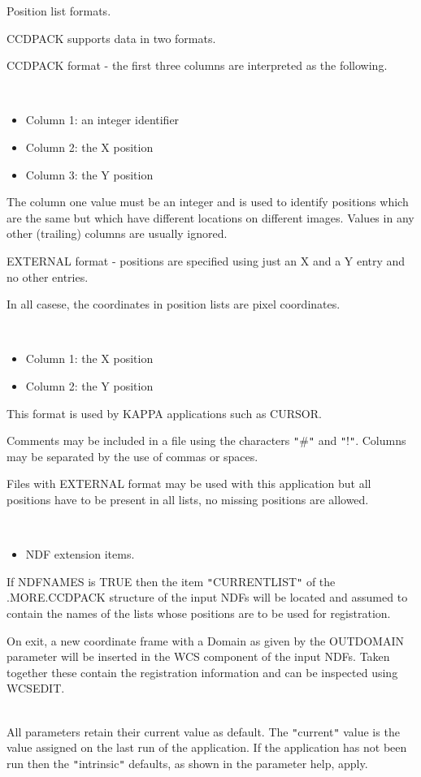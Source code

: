 \documentclass[twoside,11pt]{article}
\newcommand{\xref}[3]{#1}
\renewcommand{\_}{\texttt{\symbol{95}}}
\newcommand{\qt}[1]{{\tt "}#1{\tt "}}
\newcommand{\sstdiytopic}[2]{\item[#1:] \mbox{} \\[1.3ex] #2}
\newcommand{\sstitemlist}[1]{
  \mbox{} \\
  \vspace{-3.5ex}
  \begin{itemize}
     #1
  \end{itemize}
}
\newcommand{\sstitem}{\item}
\newcommand{\sstdiytopic}[2]{\item[{#1}] #2 }
\newcommand{\sstitemlist}[1]{
      \begin{itemize}
         #1
      \end{itemize}
      \\
   }
\newcommand{\sstitem}{\item}
\begin{document}
{{{         \sstitem
         Position list formats.

      }
        CCDPACK supports data in two formats.

        CCDPACK format - the first three columns are interpreted as the
        following.

      \sstitemlist{

         \sstitem
              Column 1: an integer identifier

         \sstitem
              Column 2: the X position

         \sstitem
              Column 3: the Y position

      }
        The column one value must be an integer and is used to identify
        positions which are the same but which have different locations
        on different images. Values in any other (trailing) columns are
        usually ignored.

        EXTERNAL format - positions are specified using just an X and
        a Y entry and no other entries.

        In all casese, the coordinates in position lists are pixel
        coordinates.

      \sstitemlist{

         \sstitem
              Column 1: the X position

         \sstitem
              Column 2: the Y position

      }
        This format is used by KAPPA applications such as
        \xref{CURSOR}{sun95}{CURSOR}.

        Comments may be included in a file using the characters \qt{\#} and
        \qt{!}. Columns may be separated by the use of commas or spaces.

        Files with EXTERNAL format may be used with this application but
        all positions have to be present in all lists, no missing
        positions are allowed.

      \sstitemlist{

         \sstitem
         NDF extension items.

      }
        If NDFNAMES is TRUE then the item \qt{CURRENT\_LIST} of the
        .MORE.CCDPACK structure of the input NDFs will be located
        and assumed to contain the names of the lists whose positions
        are to be used for registration.
 
        On exit, a new coordinate frame with a Domain as given by the
        OUTDOMAIN parameter will be inserted in the WCS component of 
        the input NDFs.  Taken together these contain the registration
        information and can be inspected using WCSEDIT.
   }
   \sstdiytopic{
      Behaviour of parameters
   } {
      All parameters retain their current value as default. The
      \qt{current} value is the value assigned on the last run of the
      application. If the application has not been run then the
      \qt{intrinsic} defaults, as shown in the parameter help, apply.

}}
\end{document}
